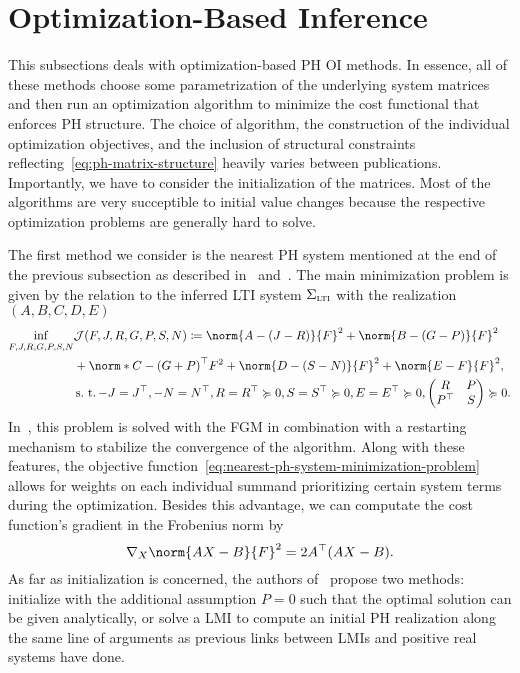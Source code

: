 \section{Optimization-Based Inference}\label{sec:optimization-based-inference}

This subsections deals with optimization-based \ac{PH} \ac{OI} methods.
In essence, all of these methods choose some parametrization of the underlying system matrices and then run an optimization algorithm to minimize the cost functional that enforces \ac{PH} structure.
The choice of algorithm, the construction of the individual optimization objectives, and the inclusion of structural constraints reflecting~\eqref{eq:ph-matrix-structure} heavily varies between publications.
Importantly, we have to consider the initialization of the matrices.
Most of the algorithms are very succeptible to initial value changes because the respective optimization problems are generally hard to solve.

The first method we consider is the nearest \ac{PH} system mentioned at the end of the previous subsection as described in~\cite{Gillis2018} and~\cite{Cherifi2019}.
The main minimization problem is given by the relation to the inferred \ac{LTI} system $\Sigma_{\textnormal{\scshape lti}}$ with the realization $(A, B, C, D, E)$
\begin{equation}\label{eq:nearest-ph-system-minimization-problem}
    \begin{alignedat}{4}
        \eqinf\limits_{F, J, R, G, P, S, N} &\mcl{J}(F, J, R, G, P, S, N) \coloneqq \norm{A - (J - R)}{F}^2 + \norm{B - (G - P)}{F}^2 \\
        &+ \norm*{C - {(G + P)}\trans}{F}^2 + \norm{D - (S - N)}{F}^2 + \norm{E - F}{F}^2, \\
        &\suchthat -J = J\trans, -N = N\trans, R = R\trans \succcurlyeq 0, S = S\trans \succcurlyeq 0, E = E\trans \succcurlyeq 0, \begin{pmatrix}
            R & P \\
            P\trans & S
        \end{pmatrix} \succcurlyeq 0.
    \end{alignedat}
\end{equation}
In~\cite{Gillis2018}, this problem is solved with the \ac{FGM} in combination with a restarting mechanism to stabilize the convergence of the algorithm.
Along with these features, the objective function~\eqref{eq:nearest-ph-system-minimization-problem} allows for weights on each individual summand prioritizing certain system terms during the optimization.
Besides this advantage, we can computate the cost function's gradient in the Frobenius norm by
\begin{equation*}
    \nabla_X \norm{A X - B}{F}^2 = 2 A\trans (A X - B).
\end{equation*}
As far as initialization is concerned, the authors of~\cite{Gillis2018} propose two methods: initialize with the additional assumption $P = 0$ such that the optimal solution can be given analytically, or solve a \ac{LMI} to compute an initial \ac{PH} realization along the same line of arguments as previous links between \acp{LMI} and positive real systems have done.

